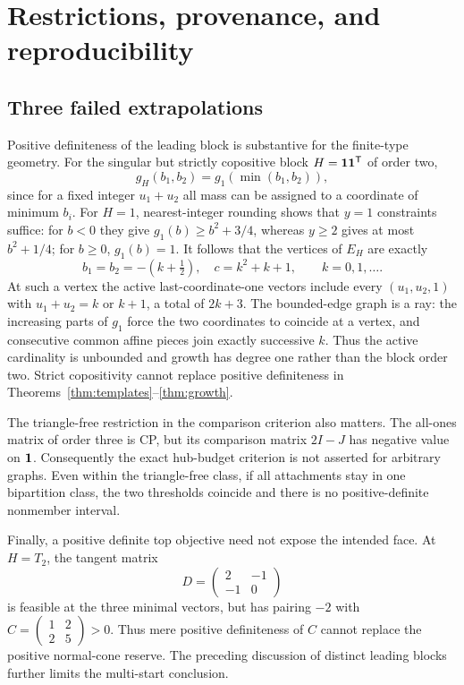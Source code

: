 \section{Restrictions, provenance, and reproducibility}
\subsection{Three failed extrapolations}
Positive definiteness of the leading block is substantive for the finite-type geometry. For the singular but strictly copositive block $H={\bf1}{\bf1}^{\mathsf T}$ of order two,
\[
 g_H(b_1,b_2)=g_1(\min(b_1,b_2)),
\]
since for a fixed integer $u_1+u_2$ all mass can be assigned to a coordinate of minimum $b_i$. For $H=1$, nearest-integer rounding shows that $y=1$ constraints suffice: for $b<0$ they give $g_1(b)\ge b^2+3/4$, whereas $y\ge2$ gives at most $b^2+1/4$; for $b\ge0$, $g_1(b)=1$. It follows that the vertices of $E_H$ are exactly
\[
 b_1=b_2=-(k+\tfrac12),\quad c=k^2+k+1,\qquad k=0,1,\ldots.
\]
At such a vertex the active last-coordinate-one vectors include every $(u_1,u_2,1)$ with $u_1+u_2=k$ or $k+1$, a total of $2k+3$. The bounded-edge graph is a ray: the increasing parts of $g_1$ force the two coordinates to coincide at a vertex, and consecutive common affine pieces join exactly successive $k$. Thus the active cardinality is unbounded and growth has degree one rather than the block order two. Strict copositivity cannot replace positive definiteness in Theorems~\ref{thm:templates}--\ref{thm:growth}.

The triangle-free restriction in the comparison criterion also matters. The all-ones matrix of order three is CP, but its comparison matrix $2I-J$ has negative value on ${\bf1}$. Consequently the exact hub-budget criterion is not asserted for arbitrary graphs. Even within the triangle-free class, if all attachments stay in one bipartition class, the two thresholds coincide and there is no positive-definite nonmember interval.

Finally, a positive definite top objective need not expose the intended face. At $H=T_2$, the tangent matrix
\[
 D=\begin{pmatrix}2&-1\\-1&0\end{pmatrix}
\]
is feasible at the three minimal vectors, but has pairing $-2$ with
$C=\left(\begin{smallmatrix}1&2\\2&5\end{smallmatrix}\right)>0$.
Thus mere positive definiteness of $C$ cannot replace the positive normal-cone reserve. The preceding discussion of distinct leading blocks further limits the multi-start conclusion.

